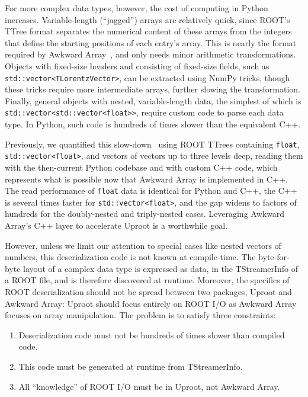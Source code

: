 \documentclass{webofc}
\begin{document}
For more complex data types, however, the cost of computing in Python increases. Variable-length (``jagged'') arrays are relatively quick, since ROOT's TTree format separates the numerical content of these arrays from the integers that define the starting positions of each entry's array. This is nearly the format required by Awkward Array~\cite{awkward}, and only needs minor arithmetic transformations. Objects with fixed-size headers and consisting of fixed-size fields, such as \texttt{std::vector<TLorentzVector>}, can be extracted using NumPy tricks, though these tricks require more intermediate arrays, further slowing the transformation. Finally, general objects with nested, variable-length data, the simplest of which is \texttt{std::vector<std::vector<float>>}, require custom code to parse each data type. In Python, such code is hundreds of times slower than the equivalent C++.

Previously, we quantified this slow-down~\cite{chep2019} using ROOT TTrees containing \texttt{float}, \texttt{std::vector<float>}, and vectors of vectors up to three levels deep, reading them with the then-current Python codebase and with custom C++ code, which represents what is possible now that Awkward Array is implemented in C++. The read performance of \texttt{float} data is identical for Python and C++, the C++ is several times faster for \texttt{std::vector<float>}, and the gap widens to factors of hundreds for the doubly-nested and triply-nested cases. Leveraging Awkward Array's C++ layer to accelerate Uproot is a worthwhile goal.

However, unless we limit our attention to special cases like nested vectors of numbers, this deserialization code is not known at compile-time. The byte-for-byte layout of a complex data type is expressed as data, in the TStreamerInfo of a ROOT file, and is therefore discovered at runtime. Moreover, the specifics of ROOT deserialization should not be spread between two packages, Uproot and Awkward Array: Uproot should focus entirely on ROOT I/O as Awkward Array focuses on array manipulation. The problem is to satisfy three constraints:
\begin{enumerate}
\item Deserialization code must not be hundreds of times slower than compiled code.
\item This code must be generated at runtime from TStreamerInfo.
\item All ``knowledge'' of ROOT I/O must be in Uproot, not Awkward Array.
\end{enumerate}
\end{document}
